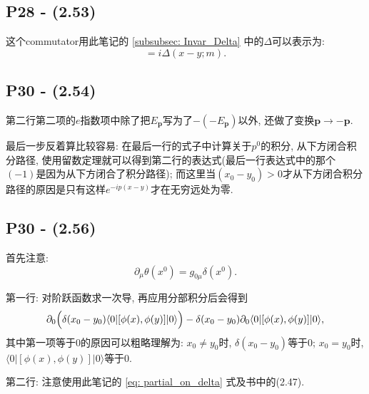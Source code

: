 \subsection{P28 - (2.53)}

这个commutator用此笔记的 \ref{subsubsec: Invar_Delta} 中的$\Delta$可以表示为:
\begin{equation}
  [\phi(x), \phi(y)] = i\Delta(x-y; m).
\end{equation}


\subsection{P30 - (2.54)}

第二行第二项的$e$指数项中除了把$E_\mathbf{p}$写为了$-(-E_\mathbf{p})$以外, 还做了变换$\mathbf{p} \rightarrow -\mathbf{p}$.

最后一步反着算比较容易: 在最后一行的式子中计算关于$p^0$的积分, 从下方闭合积分路径, 使用留数定理就可以得到第二行的表达式(最后一行表达式中的那个$(-1)$是因为从下方闭合了积分路径); 而这里当$(x_0 - y_0)>0$才从下方闭合积分路径的原因是只有这样$e^{-ip(x - y)}$才在无穷远处为零.

\subsection{P30 - (2.56)}

首先注意:
\begin{equation}
  \partial_\mu \theta(x^0) = g_{0\mu} \delta(x^0) \label{eq: partial_on_delta}.
\end{equation}

第一行: 对阶跃函数求一次导, 再应用分部积分后会得到
\begin{equation}
  \partial_0 \Bigl(\delta(x_0 - y_0)\langle 0|[\phi(x), \phi(y)]|0\rangle \Bigr)-\delta(x_0 - y_0)\partial_0\langle 0|[\phi(x), \phi(y)]|0\rangle,
\end{equation}
其中第一项等于0的原因可以粗略理解为: $x_0 \neq y_0$时, $\delta(x_0 - y_0)$等于0; $x_0 = y_0$时, $\langle 0|[\phi(x), \phi(y)]|0\rangle$等于0.

第二行: 注意使用此笔记的 \eqref{eq: partial_on_delta} 式及书中的(2.47).

